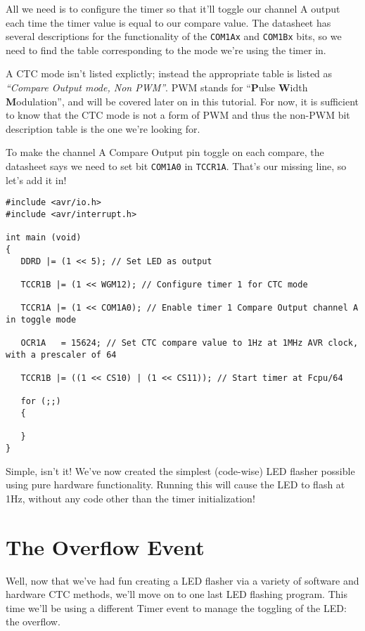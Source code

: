 \documentclass[a4paper,oneside,notitlepage]{book}
\begin{document}
All we need is to configure the timer so that it'll toggle our channel A output each time the timer value is equal to our compare value. The datasheet has several descriptions for the functionality of the \texttt{COM1Ax} and \texttt{COM1Bx} bits, so we need to find the table corresponding to the mode we're using the timer in.

A CTC mode isn't listed explictly; instead the appropriate table is listed as \textit{``Compare Output mode, Non PWM''}. PWM stands for ``\textbf{P}ulse \textbf{W}idth \textbf{M}odulation'', and will be covered later on in this tutorial. For now, it is sufficient to know that the CTC mode is not a form of PWM and thus the non-PWM bit description table is the one we're looking for.

To make the channel A Compare Output pin toggle on each compare, the datasheet says we need to set bit \texttt{COM1A0} in \texttt{TCCR1A}. That's our missing line, so let's add it in!

\begin{center}
\begin{lstlisting}
#include <avr/io.h>
#include <avr/interrupt.h>

int main (void)
{
   DDRD |= (1 << 5); // Set LED as output

   TCCR1B |= (1 << WGM12); // Configure timer 1 for CTC mode

   TCCR1A |= (1 << COM1A0); // Enable timer 1 Compare Output channel A in toggle mode

   OCR1A   = 15624; // Set CTC compare value to 1Hz at 1MHz AVR clock, with a prescaler of 64

   TCCR1B |= ((1 << CS10) | (1 << CS11)); // Start timer at Fcpu/64

   for (;;)
   {

   }
} 
\end{lstlisting}
\end{center}

Simple, isn't it! We've now created the simplest (code-wise) LED flasher possible using pure hardware functionality. Running this will cause the LED to flash at 1Hz, without any code other than the timer initialization! 


\label{chp:Overflows}
\chapter{The Overflow Event}

Well, now that we've had fun creating a LED flasher via a variety of software and hardware CTC methods, we'll move on to one last LED flashing program. This time we'll be using a different Timer event to manage the toggling of the LED: the overflow.
\end{document}
